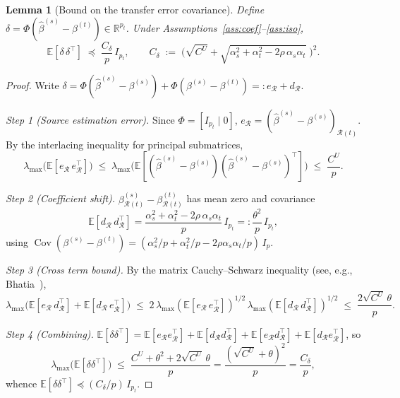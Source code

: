 \documentclass[11pt,a4paper]{article}
\newtheorem{lemma}[theorem]{Lemma}
\theoremstyle{definition}
\DeclareMathOperator{\Cov}{Cov}
\newcommand{\R}{\mathbb{R}}
\newcommand{\E}{\mathbb{E}}
\newcommand{\cR}{\mathcal{R}}
\newcommand{\bhat}{\hat{\beta}^{(s)}}
\begin{document}
\begin{lemma}[Bound on the transfer error covariance]\label{lem:delta}
Define $\delta=\Phi(\bhat-\beta^{(t)})\in\R^{p_t}$.  Under
Assumptions~\ref{ass:coef}--\ref{ass:iso},
\[
  \E[\delta\,\delta^{\top}]
  \;\preceq\;
  \frac{C_\delta}{p}\,I_{p_t},
  \qquad
  C_\delta\;:=\;\bigl(\sqrt{C^{U}}
  +\sqrt{\alpha_s^{2}+\alpha_t^{2}-2\rho\,\alpha_s\alpha_t}\;\bigr)^{2}.
\]
\end{lemma}

\begin{proof}
Write $\delta=\Phi(\bhat-\beta^{(s)})+\Phi(\beta^{(s)}-\beta^{(t)})
=:e_{\cR}+d_{\cR}$.

\medskip
\noindent\emph{Step 1 (Source estimation error).}\quad
Since $\Phi=[I_{p_t}\mid 0]$,
$e_{\cR}=(\bhat-\beta^{(s)})_{\cR(t)}$.
By the interlacing inequality for principal submatrices,
\[
  \lambda_{\max}\!\bigl(\E[e_{\cR}\,e_{\cR}^{\top}]\bigr)
  \;\le\;
  \lambda_{\max}\!\bigl(\E[(\bhat-\beta^{(s)})
  (\bhat-\beta^{(s)})^{\top}]\bigr)
  \;\le\;\frac{C^{U}}{p}.
\]

\noindent\emph{Step 2 (Coefficient shift).}\quad
$\beta^{(s)}_{\cR(t)}-\beta^{(t)}_{\cR(t)}$ has mean zero and
covariance
\[
  \E[d_{\cR}\,d_{\cR}^{\top}]
  =\frac{\alpha_s^{2}+\alpha_t^{2}-2\rho\,\alpha_s\alpha_t}{p}\,I_{p_t}
  =:\frac{\theta^{2}}{p}\,I_{p_t},
\]
using $\Cov(\beta^{(s)}-\beta^{(t)})
=(\alpha_s^{2}/p+\alpha_t^{2}/p-2\rho\alpha_s\alpha_t/p)\,I_p$.

\medskip
\noindent\emph{Step 3 (Cross term bound).}\quad
By the matrix Cauchy--Schwarz inequality (see, e.g., Bhatia~\cite{bhatia}),
\[
  \lambda_{\max}\!\bigl(\E[e_{\cR}\,d_{\cR}^{\top}]
  +\E[d_{\cR}\,e_{\cR}^{\top}]\bigr)
  \;\le\;
  2\,\lambda_{\max}(\E[e_{\cR}\,e_{\cR}^{\top}])^{1/2}\,
    \lambda_{\max}(\E[d_{\cR}\,d_{\cR}^{\top}])^{1/2}
  \;\le\;
  \frac{2\sqrt{C^{U}}\,\theta}{p}.
\]

\noindent\emph{Step 4 (Combining).}\quad
$\E[\delta\delta^{\top}]
=\E[e_{\cR}e_{\cR}^{\top}]+\E[d_{\cR}d_{\cR}^{\top}]
+\E[e_{\cR}d_{\cR}^{\top}]+\E[d_{\cR}e_{\cR}^{\top}]$, so
\[
  \lambda_{\max}\!\bigl(\E[\delta\delta^{\top}]\bigr)
  \;\le\;
  \frac{C^{U}+\theta^{2}+2\sqrt{C^{U}}\,\theta}{p}
  =\frac{(\sqrt{C^{U}}+\theta)^{2}}{p}
  =\frac{C_\delta}{p},
\]
whence $\E[\delta\delta^{\top}]\preceq(C_\delta/p)\,I_{p_t}$.
\end{proof}
\end{document}
